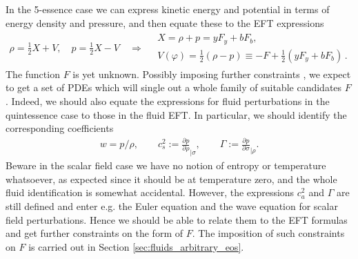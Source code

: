 In the 5-essence case we can express kinetic energy and potential in terms of energy density and pressure, and then equate these to the EFT expressions
\begin{align}\label{eq:identiying_rho_p_vs_scalar_field}
    \rho=\tfrac12 X +V, \quad p =\tfrac12 X -V\quad \Rightarrow\quad \begin{array}{c}
        X=\rho+p = yF_y + bF_b,\\
        V(\varphi) = \tfrac12(\rho - p) \equiv -F +\tfrac12 (yF_y+ bF_b)\,.
    \end{array}
\end{align}
The function $F$ is yet unknown.
Possibly imposing further constraints , we expect to get a set of PDEs which will single out a whole family of suitable candidates $F$.
Indeed, we should also equate the expressions for fluid perturbations in the quintessence case to those in the fluid EFT.
In particular, we should identify the corresponding coefficients 
\begin{align}
    w=p/\rho,\qquad c_s^2:=\frac{\partial p}{\partial \rho}_{|\sigma},\qquad \Gamma:=\frac{\partial p}{\partial \sigma}_{|\rho}.
\end{align}
Beware in the scalar field case we have no notion of entropy or temperature whatsoever, as expected since it should be at temperature zero, and the whole fluid identification is somewhat accidental.
However, the expressions $c_a^2$ and $\Gamma$ are still defined and enter e.g. the Euler equation and the wave equation for scalar field perturbations.
Hence we should be able to relate them to the EFT formulas and get further constraints on the form of $F$.
The imposition of such constraints on $F$ is carried out in Section \ref{sec:fluids_arbitrary_eos}.

